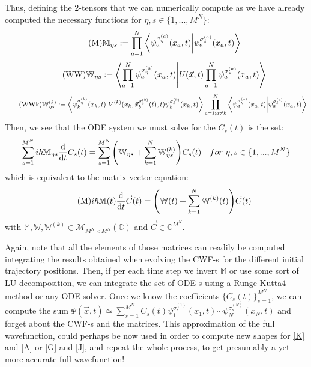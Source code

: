 \documentclass[11pt, a4paper]{article} %
\newcommand{\M}{\mathcal{M}}
\newcommand{\C}{\mathbb{C}}
\begin{document}
Thus, defining the 2-tensors that we can numerically compute as we have already computed the necessary functions for $\eta,s \in \{1,...,M^N \}$:
\begin{equation}\label{M}\tag{M}
\mathbb{M}_{\eta s}:= \prod_{a=1}^N \bra{\psi_a^{\sigma_\eta^{(a)}}(x_a,t)}\ket{\psi_a^{\sigma_s^{(a)}}(x_a,t)}
\end{equation}
\begin{equation}\label{W}\tag{WW}
\mathbb{W}_{\eta s}:=\bra{\prod_{a=1}^N  \psi_a^{\sigma_\eta^{(a)}}(x_a,t)}\ket{U(\vec{x},t)  \prod_{a=1}^N \psi_a^{\sigma_s^{(a)}}(x_a,t)}
\end{equation}
\begin{equation}\label{PDE.c}\tag{WWk}
\mathbb{W}_{\eta s}^{(k)} :=\bra{\psi_k^{\sigma_\eta^{(k)}}(x_k,t)}\ket{V^{(k)}(x_k,\vec{x}_b^{\sigma_s^{(k)}}(t),t) \psi_k^{\sigma_s^{(k)}}(x_k,t)} \prod_{a=1;a\neq k}^N  \bra{\psi_a^{\sigma_\eta^{(a)}}(x_a,t)}\ket{\psi_a^{\sigma_s^{(a)}}(x_a,t)}
\end{equation}
Then, we see that the ODE system we must solve for the $C_s(t)$ is the set:
$$
\sum_{s=1}^{M^N} i\hbar \mathbb{M}_{\eta s} \dv{}{t}C_s(t) = \sum_{s=1}^{M^N} \qty( \mathbb{W}_{\eta s}+\sum_{k=1}^{N} \mathbb{W}^{(k)}_{\eta s})C_s(t) \quad for\ \eta,s \in \{1,...,M^N \}
$$
which is equivalent to the matrix-vector equation:
\begin{equation}\label{M}\tag{M}
i\hbar \mathbb{M}(t) \dv{}{t}\vec{C}(t) =\qty( \mathbb{W}(t)+\sum_{k=1}^{N} \mathbb{W}^{(k)}(t))\vec{C}(t)
\end{equation}
with $\mathbb{M}, \mathbb{W}, \mathbb{W}^{(k)}\in \M_{M^N \times M^N}(\C)$ and $\vec{C}\in \C^{M^N}$.

Again, note that all the elements of those matrices can readily be computed integrating the results obtained when evolving the CWF-s for the different initial trajectory positions. Then, if per each time step we invert $\mathbb{M}$ or use some sort of LU decomposition, we can integrate the set of ODE-s using a Runge-Kutta4 method or any ODE solver. Once we know the coefficients $\{C_s(t)\}_{s=1}^{M^N}$, we can compute the sum $\Psi(\vec{x},t)\simeq \sum_{s=1}^{M^N} C_s(t) \psi_1^{\sigma^{(1)}_s}(x_1,t)\cdots \psi_N^{\sigma^{(N)}_s}(x_N,t)$ and forget about the CWF-s and the matrices. This approximation of the full wavefunction, could perhaps be now used in order to compute new shapes for \ref{K} and \ref{A} or \ref{G} and \ref{J}, and repeat the whole process, to get presumably a yet more accurate full wavefunction!
\end{document}
